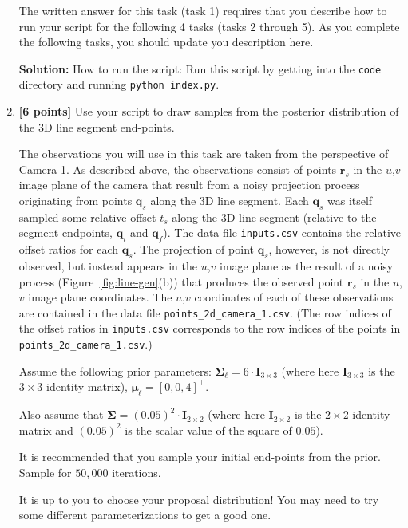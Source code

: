 \documentclass[10pt]{article}
\begin{document}
\begin{enumerate}
The written answer for this task (task 1) requires that you describe how to run your script for the following 4 tasks (tasks 2 through 5). As you complete the following tasks, you should update you description here.

\textbf{Solution:}
How to run the script: 
Run this script by getting into the {\tt code} directory and running {\tt python index.py}. 

\item {\bf [6 points]} \label{task-b} Use your script to draw samples from the posterior distribution of the 3D line segment end-points. 

The observations you will use in this task are taken from the perspective of Camera 1.
As described above, the observations consist of points $\mathbf{r}_s$ in the $u$,$v$ image plane of the camera that result from a noisy projection process originating from points $\mathbf{q}_s$ along the 3D line segment.
Each $\mathbf{q}_s$ was itself sampled some relative offset $t_s$ along the 3D line segment (relative to the segment endpoints, $\mathbf{q}_i$ and $\mathbf{q}_f$). The data file {\tt inputs.csv} contains the relative offset ratios for each $\mathbf{q}_s$. 
The projection of point $\mathbf{q}_s$, however, is not directly observed, but instead appears in the $u$,$v$ image plane as the result of a noisy process (Figure~\ref{fig:line-gen}(b)) that produces the observed point $\mathbf{r}_s$ in the $u$,$v$ image plane coordinates. The $u$,$v$ coordinates of each of these observations are contained in the data file {\tt points\_2d\_camera\_1.csv}. (The row indices of the offset ratios in {\tt inputs.csv} corresponds to the row indices of the points in {\tt points\_2d\_camera\_1.csv}.)

Assume the following prior parameters: $\boldsymbol{\Sigma}_{\boldsymbol{\ell}} = 6 \cdot \mathbf{I}_{3 \times 3}$ (where here $\mathbf{I}_{3 \times 3}$ is the $3 \times 3$ identity matrix), $\boldsymbol{\mu}_{\boldsymbol{\ell}} = [0,0,4]^{\top}$.

Also assume that $\boldsymbol{\Sigma} = (0.05)^2 \cdot \mathbf{I}_{2 \times 2}$ (where here $\mathbf{I}_{2 \times 2}$ is the $2 \times 2$ identity matrix and $(0.05)^2$ is the scalar value of the square of $0.05$).  

It is recommended that you sample your initial end-points from the prior.  Sample for $50,000$ iterations.  

It is up to you to choose your proposal distribution! You may need to try some different parameterizations to get a good one.


\end{enumerate}
\end{document}
